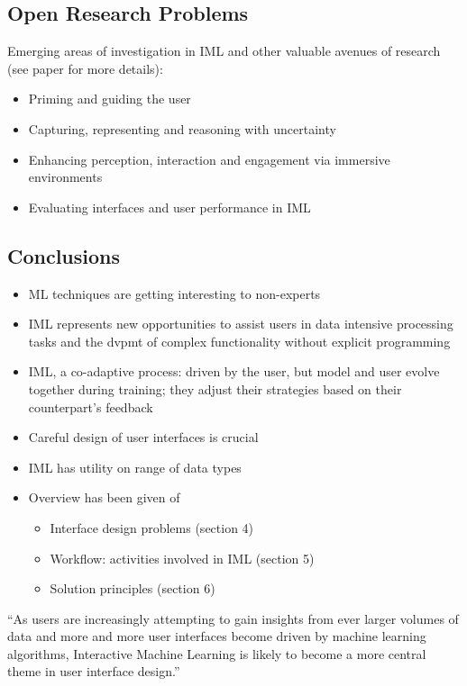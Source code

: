 \documentclass[12pt,a4paper]{article}
\begin{document}
\subsection{Open Research Problems}
Emerging areas of investigation in IML and other valuable avenues of research (see paper for more details):
\begin{itemize}
\item Priming and guiding the user
\item Capturing, representing and reasoning with uncertainty
\item Enhancing perception, interaction and engagement via immersive environments
\item Evaluating interfaces and user performance in IML
\end{itemize}
%
%
\subsection{Conclusions}
\begin{itemize}
\item ML techniques are getting interesting to non-experts
\item IML represents new opportunities to assist users in data intensive processing tasks and the dvpmt of complex functionality without explicit programming
\item IML, a co-adaptive process: driven by the user, but model and user evolve together during training; they adjust their strategies based on their counterpart's feedback
\item Careful design of user interfaces is crucial
\item IML has utility on range of data types
\item Overview has been given of 
\begin{itemize}
\item Interface design problems (section 4)
\item Workflow: activities involved in IML (section 5)
\item Solution principles (section 6)
\end{itemize}
\end{itemize}
\begin{description}
\item ``As users are increasingly attempting to gain insights from ever larger volumes of data and more and more user interfaces become driven by machine learning algorithms, Interactive Machine Learning is likely to become a more central theme in user interface design.''
\end{description}
\end{document}
